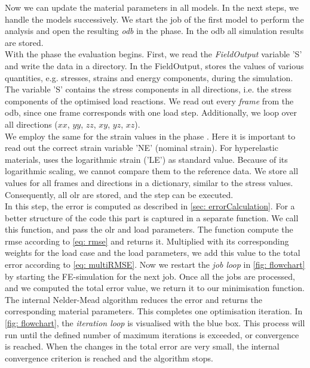 Now we can update the material parameters in all models. In the next steps, we handle the models successively.
We start the job of the first model to perform the  analysis and open the resulting \emph{\acrfull{odb}} in the  phase. In the \acrshort{odb} all simulation results are stored.\\
\indent With the phase  the evaluation begins. First, we read the \emph{FieldOutput} variable 'S' and write the data in a directory. In the FieldOutput,  stores the values of various quantities, e.g. stresses, strains and energy components, during the simulation.
The variable 'S' contains the stress components in all directions, i.e. the stress components of the optimised load reactions.
We read out every \emph{frame} from the \acrshort{odb}, since one frame corresponds with one load step.
Additionally, we loop over all directions ($xx$, $yy$, $zz$, $xy$, $yz$, $xz$). \\
\indent We employ the same for the strain values in the phase .
Here it is important to read out the correct strain variable 'NE' (nominal strain).
For hyperelastic materials,  uses the logarithmic strain ('LE') as standard value. Because of its logarithmic scaling, we cannot compare them to the reference data. We store all values for all frames and directions in a dictionary, similar to the stress values.
Consequently, all \acrlong{olr} are stored, and the step  can be executed. \\
\indent In this step, the error is computed as described in \autoref{sec: errorCalculation}.
For a better structure of the code this part is captured in a separate function.
We call this function, and pass the \acrlong{olr} and load parameters.
The function compute the \acrshort{rmse} according to \autoref{eq: rmse} and returns it.
Multiplied with its corresponding weights for the load case and the load parameters, we add this value to the total error according to \autoref{eq: multiRMSE}.
Now we restart the \emph{job loop} in \autoref{fig: flowchart} by starting the FE-simulation for the next job.
Once all the jobs are processed, and we computed the total error value, we return it to our minimisation function.
The internal Nelder-Mead algorithm reduces the error and returns the corresponding material parameters.
This completes one optimisation iteration. In \autoref{fig: flowchart}, the \emph{iteration loop} is visualised with the blue box.
This process will run until the defined number of maximum iterations is exceeded, or convergence is reached. When the changes in the total error are very small, the internal convergence criterion is reached and the algorithm stops.


